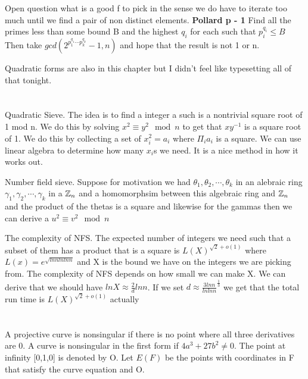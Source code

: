 \documentclass{article}
\begin{document}
Open question what is a good f to pick in the sense we do have to iterate too much until we find a pair of non distinct elements. 
\textbf{Pollard p - 1}
Find all the primes less than some bound B and the highest $q_i$ for each such that $p_i ^ {q_i} \leq B$ Then take $gcd ( 2 ^ {p_1 ^ {q_1} \cdots p_k ^ {q_k}} - 1, n)$ and hope that the result is not 1 or n. 

Quadratic forms are also in this chapter but I didn't feel like typesetting all of that tonight. 
\section{}
Quadratic Sieve. 
The idea is to find a integer a such is a nontrivial square root of 1 mod n. We do this by solving $x^2 \equiv y^2 \mod n $ to get that $x y ^ {-1} $ is a square root of 1. We do this by collecting a set of $x_i ^2 = a_i$ where $\Pi _i a_i $ is a square. We can use linear algebra to determine how many $x_i$s we need. It is a nice method in how it works out. 

Number field sieve.
Suppose for motivation we had $\theta_1 , \theta_2, \cdots, \theta_k$ in an alebraic ring $\gamma_1, \gamma_2, \cdots, \gamma_k$ in a $\mathbb{Z} _n$ and a homomorphsim between this algebraic ring and $\mathbb{Z}_n$ and the product of the thetas is a square and likewise for the gammas  then we can derive a $u^2 \equiv v^2 \mod n$

The complexity of NFS.
The expected number of integers we need such that a subset of them has a product that is a square is $L(X)^{\sqrt{2} + o(1)}$ where $L(x) = e ^ {\sqrt{ln n ln ln n }}$ and X is the bound we have on the integers we are picking from. The complexity of NFS depends on how small we can make X. We can derive that we should have $ln X \approx \frac{2}{d} ln n$. If we set $d \approx \frac{3 ln n}{ln ln n}^\frac{1}{3}$ we get that the total run time is $L(X)^{\sqrt{2} + o(1)}$ actually 

\section{}
A projective curve is nonsingular if there is no point where all three derivatives are 0. 
A curve is nonsingular in the first form if $4a^3 + 27b^2 \neq 0$. The point at infinity [0,1,0] is denoted by O.
Let $E(F)$ be the points with coordinates in F that satisfy the curve equation and O. 
\end{document}
